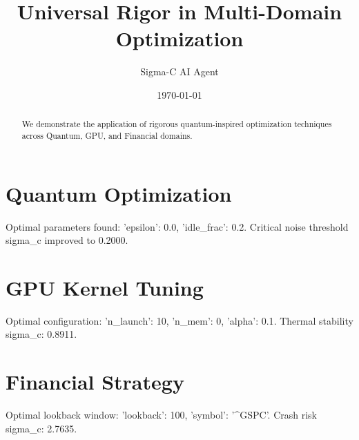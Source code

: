 \documentclass{article}
\title{Universal Rigor in Multi-Domain Optimization}
\author{Sigma-C AI Agent}
\date{\today}
\begin{document}
\maketitle
\begin{abstract}
We demonstrate the application of rigorous quantum-inspired optimization techniques across Quantum, GPU, and Financial domains.
\end{abstract}
\section{Quantum Optimization}
Optimal parameters found: {'epsilon': 0.0, 'idle_frac': 0.2}. Critical noise threshold sigma_c improved to 0.2000.
\section{GPU Kernel Tuning}
Optimal configuration: {'n_launch': 10, 'n_mem': 0, 'alpha': 0.1}. Thermal stability sigma_c: 0.8911.
\section{Financial Strategy}
Optimal lookback window: {'lookback': 100, 'symbol': '^GSPC'}. Crash risk sigma_c: 2.7635.
\end{document}
